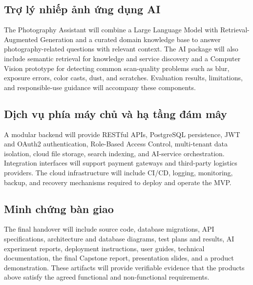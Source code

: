 \subsection*{Trợ lý nhiếp ảnh ứng dụng AI}

The Photography Assistant will combine a Large Language Model with
Retrieval-Augmented Generation and a curated domain knowledge base to answer
photography-related questions with relevant context. The AI package will also
include semantic retrieval for knowledge and service discovery and a Computer
Vision prototype for detecting common scan-quality problems such as blur,
exposure errors, color casts, dust, and scratches. Evaluation results,
limitations, and responsible-use guidance will accompany these components.

\subsection*{Dịch vụ phía máy chủ và hạ tầng đám mây}

A modular backend will provide RESTful APIs, PostgreSQL persistence, JWT and
OAuth2 authentication, Role-Based Access Control, multi-tenant data isolation,
cloud file storage, search indexing, and AI-service orchestration. Integration
interfaces will support payment gateways and third-party logistics providers.
The cloud infrastructure will include CI/CD, logging, monitoring, backup, and
recovery mechanisms required to deploy and operate the MVP.

\subsection*{Minh chứng bàn giao}

The final handover will include source code, database migrations, API
specifications, architecture and database diagrams, test plans and results, AI
experiment reports, deployment instructions, user guides, technical
documentation, the final Capstone report, presentation slides, and a product
demonstration. These artifacts will provide verifiable evidence that the
products above satisfy the agreed functional and non-functional requirements.
